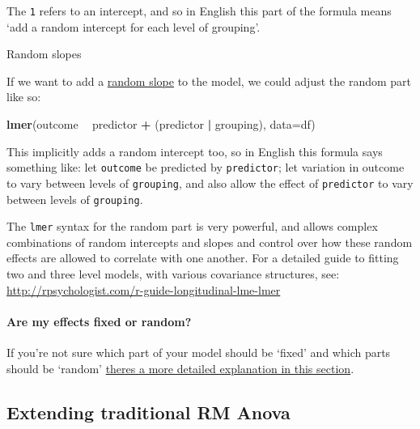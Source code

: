 \documentclass[]{article}
\newenvironment{Shaded}{\begin{snugshade}}{\end{snugshade}}
\newcommand{\KeywordTok}[1]{\textcolor[rgb]{0.13,0.29,0.53}{\textbf{#1}}}
\newcommand{\DataTypeTok}[1]{\textcolor[rgb]{0.13,0.29,0.53}{#1}}
\newcommand{\StringTok}[1]{\textcolor[rgb]{0.31,0.60,0.02}{#1}}
\newcommand{\OperatorTok}[1]{\textcolor[rgb]{0.81,0.36,0.00}{\textbf{#1}}}
\newcommand{\NormalTok}[1]{#1}
\let\oldparagraph\paragraph
\renewcommand{\paragraph}[1]{\oldparagraph{#1}\mbox{}}
\theoremstyle{definition}
\theoremstyle{definition}
\theoremstyle{definition}
\theoremstyle{remark}
\begin{document}
The \texttt{1} refers to an intercept, and so in English this part of
the formula means `add a random intercept for each level of grouping'.

Random slopes

If we want to add a \protect\hyperlink{random-slopes-intercepts}{random
slope} to the model, we could adjust the random part like so:

\begin{Shaded}
\begin{Highlighting}[]
\KeywordTok{lmer}\NormalTok{(outcome }\OperatorTok{~}\StringTok{ }\NormalTok{predictor }\OperatorTok{+}\StringTok{ }\NormalTok{(predictor }\OperatorTok{|}\StringTok{ }\NormalTok{grouping), }\DataTypeTok{data=}\NormalTok{df)}
\end{Highlighting}
\end{Shaded}

This implicitly adds a random intercept too, so in English this formula
says something like: let \texttt{outcome} be predicted by
\texttt{predictor}; let variation in outcome to vary between levels of
\texttt{grouping}, and also allow the effect of \texttt{predictor} to
vary between levels of \texttt{grouping}.

The \texttt{lmer} syntax for the random part is very powerful, and
allows complex combinations of random intercepts and slopes and control
over how these random effects are allowed to correlate with one another.
For a detailed guide to fitting two and three level models, with various
covariance structures, see:
\url{http://rpsychologist.com/r-guide-longitudinal-lme-lmer}

\paragraph{Are my effects fixed or
random?}\label{are-my-effects-fixed-or-random}

If you're not sure which part of your model should be `fixed' and which
parts should be `random' \protect\hyperlink{fixed-or-random}{theres a
more detailed explanation in this section}.

\subsection*{Extending traditional RM
Anova}\label{extending-traditional-rm-anova}
\end{document}

